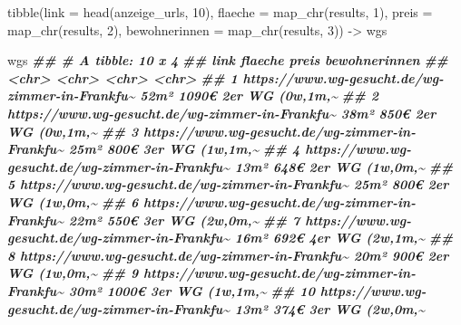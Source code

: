 \documentclass[
  ngerman,
]{article}
\newenvironment{Shaded}{\begin{snugshade}}{\end{snugshade}}
\newcommand{\AttributeTok}[1]{\textcolor[rgb]{0.77,0.63,0.00}{#1}}
\newcommand{\DecValTok}[1]{\textcolor[rgb]{0.00,0.00,0.81}{#1}}
\newcommand{\DocumentationTok}[1]{\textcolor[rgb]{0.56,0.35,0.01}{\textbf{\textit{#1}}}}
\newcommand{\FunctionTok}[1]{\textcolor[rgb]{0.00,0.00,0.00}{#1}}
\newcommand{\NormalTok}[1]{#1}
\newcommand{\OtherTok}[1]{\textcolor[rgb]{0.56,0.35,0.01}{#1}}
\begin{document}
\begin{Shaded}
\begin{Highlighting}[]
\FunctionTok{tibble}\NormalTok{(}\AttributeTok{link =} \FunctionTok{head}\NormalTok{(anzeige\_urls, }\DecValTok{10}\NormalTok{),}
       \AttributeTok{flaeche =} \FunctionTok{map\_chr}\NormalTok{(results, }\DecValTok{1}\NormalTok{),}
       \AttributeTok{preis =} \FunctionTok{map\_chr}\NormalTok{(results, }\DecValTok{2}\NormalTok{),}
       \AttributeTok{bewohnerinnen =} \FunctionTok{map\_chr}\NormalTok{(results, }\DecValTok{3}\NormalTok{)) }\OtherTok{{-}\textgreater{}}\NormalTok{ wgs}

\NormalTok{wgs}
\DocumentationTok{\#\# \# A tibble: 10 x 4}
\DocumentationTok{\#\#    link                                            flaeche preis bewohnerinnen  }
\DocumentationTok{\#\#    \textless{}chr\textgreater{}                                           \textless{}chr\textgreater{}   \textless{}chr\textgreater{} \textless{}chr\textgreater{}          }
\DocumentationTok{\#\#  1 https://www.wg{-}gesucht.de/wg{-}zimmer{-}in{-}Frankfu\textasciitilde{} 52m²    1090€ 2er WG (0w,1m,\textasciitilde{}}
\DocumentationTok{\#\#  2 https://www.wg{-}gesucht.de/wg{-}zimmer{-}in{-}Frankfu\textasciitilde{} 38m²    850€  2er WG (0w,1m,\textasciitilde{}}
\DocumentationTok{\#\#  3 https://www.wg{-}gesucht.de/wg{-}zimmer{-}in{-}Frankfu\textasciitilde{} 25m²    800€  3er WG (1w,1m,\textasciitilde{}}
\DocumentationTok{\#\#  4 https://www.wg{-}gesucht.de/wg{-}zimmer{-}in{-}Frankfu\textasciitilde{} 13m²    648€  2er WG (1w,0m,\textasciitilde{}}
\DocumentationTok{\#\#  5 https://www.wg{-}gesucht.de/wg{-}zimmer{-}in{-}Frankfu\textasciitilde{} 25m²    800€  2er WG (1w,0m,\textasciitilde{}}
\DocumentationTok{\#\#  6 https://www.wg{-}gesucht.de/wg{-}zimmer{-}in{-}Frankfu\textasciitilde{} 22m²    550€  3er WG (2w,0m,\textasciitilde{}}
\DocumentationTok{\#\#  7 https://www.wg{-}gesucht.de/wg{-}zimmer{-}in{-}Frankfu\textasciitilde{} 16m²    692€  4er WG (2w,1m,\textasciitilde{}}
\DocumentationTok{\#\#  8 https://www.wg{-}gesucht.de/wg{-}zimmer{-}in{-}Frankfu\textasciitilde{} 20m²    900€  2er WG (1w,0m,\textasciitilde{}}
\DocumentationTok{\#\#  9 https://www.wg{-}gesucht.de/wg{-}zimmer{-}in{-}Frankfu\textasciitilde{} 30m²    1000€ 3er WG (1w,1m,\textasciitilde{}}
\DocumentationTok{\#\# 10 https://www.wg{-}gesucht.de/wg{-}zimmer{-}in{-}Frankfu\textasciitilde{} 13m²    374€  3er WG (2w,0m,\textasciitilde{}}
\end{Highlighting}
\end{Shaded}
\end{document}
